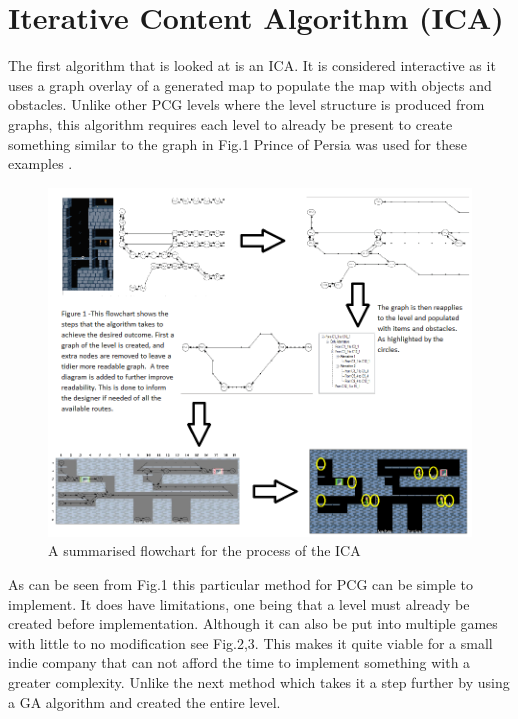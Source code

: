 \documentclass{scrartcl}
\begin{document}
\section{Iterative Content Algorithm (ICA)}

The first algorithm that is looked at is an ICA. It is considered interactive as it uses a graph overlay of a generated map to populate the map with objects and obstacles. Unlike other PCG levels where the level structure is produced from graphs, this algorithm requires each level to already be present to create something similar to the graph in Fig.1 Prince of Persia was used for these examples \cite{fausto}.


\begin{figure}[h!]
	\centering
	\includegraphics[width=1.0\linewidth]{Flowchart1}
	\caption{A summarised flowchart for the process of the ICA \cite{fausto}}
	\label{Fig1}
\end{figure}
\newpage
As can be seen from Fig.1 this particular method for PCG can be simple to implement. It does have limitations, one being that a level must already be created before implementation. Although it can also be put into multiple games with little to no modification see Fig.2,3. This makes it quite viable for a small indie company that can not afford the time to implement something with a greater complexity. Unlike the next method which takes it a step further by using a GA algorithm and created the entire level.
\end{document}
